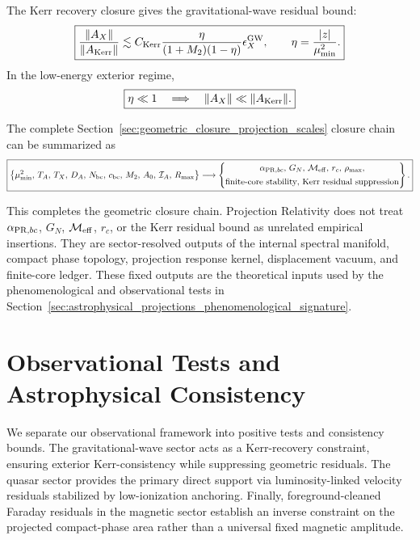 \documentclass[11pt]{article}
\begin{document}
The Kerr recovery closure gives the gravitational-wave residual bound:
\begin{equation}
\boxed{
\frac{\|A_X\|}{\|A_{\rm Kerr}\|}
\lesssim
C_{\rm Kerr}
\frac{\eta}{(1+M_2)(1-\eta)}
\epsilon_X^{\rm GW},
\qquad
\eta=\frac{|z|}{\mu_{\min}^2}.
}
\end{equation}
In the low-energy exterior regime,
\begin{equation}
\boxed{
\eta\ll1
\quad
\Longrightarrow
\quad
\|A_X\|\ll\|A_{\rm Kerr}\|.
}
\end{equation}

The complete Section~\ref{sec:geometric_closure_projection_scales} closure chain
can be summarized as
\small{
\begin{equation}
\boxed{
\left\{
\mu_{\min}^2,\, T_A,\, T_X,\, D_A,\, N_{\rm bc},\, c_{\rm bc},\, M_2,\, A_0,\, \mathcal I_A,\, R_{\max}
\right\}
\longrightarrow
\left\{
\begin{array}{@{}c@{}}
\alpha_{{\rm PR},bc},\, G_N,\, \mathcal M_{\rm eff},\, r_c,\, \rho_{\max}, \\[1ex]
\text{finite-core stability},\, \text{Kerr residual suppression}
\end{array}
\right\}.
}
\end{equation}}

This completes the geometric closure chain. Projection Relativity does not treat
\(\alpha_{{\rm PR},bc}\), \(G_N\), \(\mathcal M_{\rm eff}\), \(r_c\), or the
Kerr residual bound as unrelated empirical insertions. They are sector-resolved
outputs of the internal spectral manifold, compact phase topology, projection
response kernel, displacement vacuum, and finite-core ledger. These fixed
outputs are the theoretical inputs used by the phenomenological and
observational tests in Section~\ref{sec:astrophysical_projections_phenomenological_signature}.

\section{Observational Tests and Astrophysical Consistency}
\label{sec:observational_tests}
\label{sec:astrophysical_projections_phenomenological_signature}


We separate our observational framework into positive tests and consistency bounds. The gravitational-wave sector acts as a Kerr-recovery constraint, ensuring exterior Kerr-consistency while suppressing geometric residuals. The quasar sector provides the primary direct support via luminosity-linked velocity residuals stabilized by low-ionization anchoring. Finally, foreground-cleaned Faraday residuals in the magnetic sector establish an inverse constraint on the projected compact-phase area rather than a universal fixed magnetic amplitude.
\end{document}
